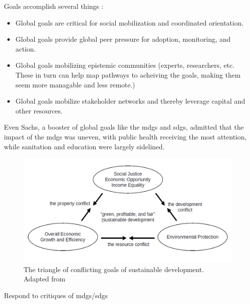 Goals accomplish several things \cite{sachsAgeSustainableDevelopment2015}:

\begin{itemize}
    \setlength{\itemsep}{0pt}%
    \setlength{\parskip}{0pt}%
	\item{Global goals are critical for social mobilization and coordinated orientation.}
	\item{Global goals provide global peer pressure for adoption, monitoring, and action.}
	\item{Global goals mobilizing epistemic communities (experts, researchers, etc. These in turn can help map pathways to acheiving the goals, making them seem more managable and less remote.)}
	\item{Global goals mobilize stakeholder networks and thereby leverage capital and other resources.}
\end{itemize}

Even Sachs, a booster of global goals like the \acp{mdg} and \acp{sdg}, admitted that the impact of the \acp{mdg} was uneven, with public health receiving the most attention, while sanitation and education were largely sidelined. \cite{sachsAgeSustainableDevelopment2015}

\begin{figure}[h]
	\centering
	\includegraphics[scale=0.35]{Figures/chap2/sustainable_triangle.png}
	\caption[The triangle of conflicting goals of sustainable development]{The triangle of conflicting goals of sustainable development. Adapted from \cite{campbellGreenCitiesGrowing2016}}
	\label{fig:sustainable_triangle}
\end{figure}

Respond to critiques of \acp{mdg}/\acp{sdg} \cite{alstonShipsPassingNight2005, reddyGlobalDevelopmentGoals2008}





